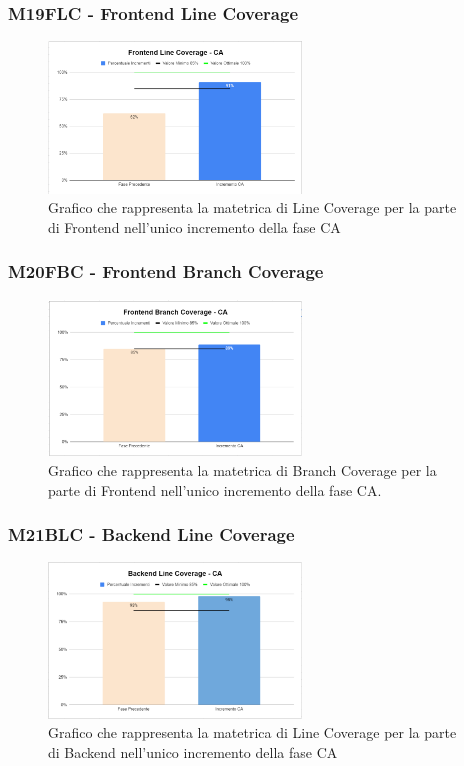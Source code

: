 \subsubsection{M19FLC - Frontend Line Coverage}
\begin{figure}[H]
 \centering\includegraphics[width=0.6\textwidth, height=0.6\textheight,keepaspectratio]{images/CA-Frontend-Line.png}
  \caption{Grafico che rappresenta la matetrica di Line Coverage per la parte di Frontend nell'unico incremento della fase CA}
\end{figure}    

\subsubsection{M20FBC - Frontend Branch Coverage}
\begin{figure}[H]
  \centering\includegraphics[width=0.6\textwidth, height=0.6\textheight,keepaspectratio]{images/CA-Frontend-Branch.png}
  \caption{Grafico che rappresenta la matetrica di Branch Coverage per la parte di Frontend nell'unico incremento della fase CA.}
\end{figure}    

\subsubsection{M21BLC - Backend Line Coverage}
\begin{figure}[H]
    \centering\includegraphics[width=0.6\textwidth, height=0.6\textheight,keepaspectratio]{images/CA-Backend-Line.png}
    \caption{Grafico che rappresenta la matetrica di Line Coverage per la parte di Backend nell'unico incremento della fase CA}
\end{figure}    

